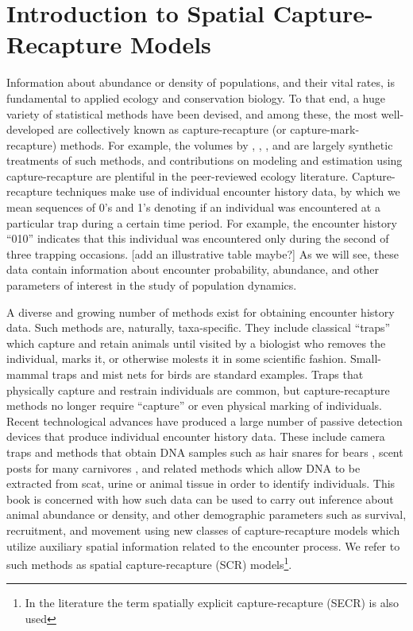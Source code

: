 \chapter{
Introduction to Spatial Capture-Recapture Models
}
\label{chapt.intro}


\vspace{.3in}

Information about abundance or density of populations, and their vital
rates, is fundamental to applied ecology and conservation biology.  To
that end, a huge variety of statistical methods have been devised, and
among these, the most well-developed are collectively known as
capture-recapture (or capture-mark-recapture) methods. For example,
the volumes by \citet{seber:1982}, \citet{borchers_etal:2002},
\citet{williams_etal:2002}, and \citet{amstrup_etal:2005} are largely
synthetic treatments of such methods, and contributions on modeling
and estimation using capture-recapture are plentiful in the
peer-reviewed ecology literature.  Capture-recapture techniques make
use of individual encounter history data, by which we mean sequences
of 0's and 1's denoting if an individual was encountered at a
particular trap during a certain time period. For example, the
encounter history ``010'' indicates that this individual was
encountered only during the second of three trapping occasions. [add
an illustrative table maybe?] As we will see, these data contain
information about encounter probability, abundance, and other
parameters of interest in the study of population dynamics.

A diverse and growing number of methods exist for obtaining encounter
history data. Such methods are, naturally, taxa-specific. They include
classical ``traps'' which capture and retain animals until visited by
a biologist who removes the individual, marks it, or otherwise molests
it in some scientific fashion.  Small-mammal traps and mist nets for
birds are standard examples. Traps that physically capture and
restrain individuals are common, but capture-recapture methods no
longer require ``capture'' or even physical marking of individuals.
Recent technological advances have produced a
large number of passive detection devices that produce individual
encounter history data. These include camera traps
\citep{karanth_nichols:1998, oconnell_etal:2010} and methods that obtain DNA
samples such as hair snares for bears \citep{gardner_etal:2010}, scent
posts for many carnivores \citep{kery_etal:2010}, and related methods which allow DNA
to be extracted from scat, urine or animal tissue in order to identify
individuals.  This book is concerned with how such data can be used to
carry out inference about animal abundance or density, and other
demographic parameters such as survival, recruitment, and movement
using new classes of capture-recapture models which utilize auxiliary
spatial information related to the encounter process.  We refer to
such methods as spatial capture-recapture (SCR) models\footnote{In
the literature the term spatially explicit capture-recapture (SECR) is
also used}.

